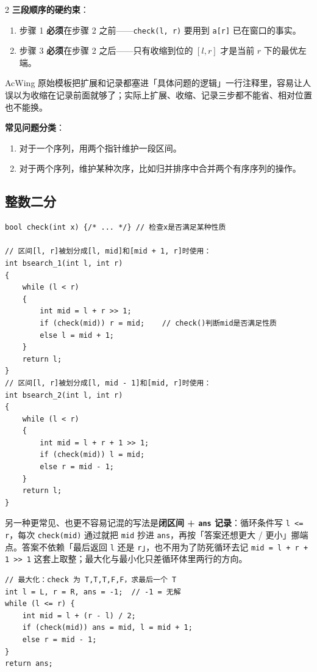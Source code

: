 \begin{multicols*}{2}
		\textbf{三段顺序的硬约束}：

		\begin{enumerate}
			\item 步骤 1 \textbf{必须}在步骤 2 之前——\texttt{check(l, r)} 要用到 \texttt{a[r]} 已在窗口的事实。
			\item 步骤 3 \textbf{必须}在步骤 2 之后——只有收缩到位的 $[l, r]$ 才是当前 $r$ 下的最优左端。
		\end{enumerate}

		AcWing 原始模板把扩展和记录都塞进「具体问题的逻辑」一行注释里，容易让人误以为收缩在记录前面就够了；实际上扩展、收缩、记录三步都不能省、相对位置也不能换。

		\textbf{常见问题分类}：

		\begin{enumerate}
			\item 对于一个序列，用两个指针维护一段区间。
			\item 对于两个序列，维护某种次序，比如归并排序中合并两个有序序列的操作。
		\end{enumerate}

		\subsection{整数二分}

		\begin{verbatim}
bool check(int x) {/* ... */} // 检查x是否满足某种性质

// 区间[l, r]被划分成[l, mid]和[mid + 1, r]时使用：
int bsearch_1(int l, int r)
{
    while (l < r)
    {
        int mid = l + r >> 1;
        if (check(mid)) r = mid;    // check()判断mid是否满足性质
        else l = mid + 1;
    }
    return l;
}
// 区间[l, r]被划分成[l, mid - 1]和[mid, r]时使用：
int bsearch_2(int l, int r)
{
    while (l < r)
    {
        int mid = l + r + 1 >> 1;
        if (check(mid)) l = mid;
        else r = mid - 1;
    }
    return l;
}
		\end{verbatim}

		另一种更常见、也更不容易记混的写法是\textbf{闭区间 + \texttt{ans} 记录}：循环条件写 \texttt{l <= r}，每次 \texttt{check(mid)} 通过就把 \texttt{mid} 抄进 \texttt{ans}，再按「答案还想更大 / 更小」挪端点。答案不依赖「最后返回 \texttt{l} 还是 \texttt{r}」，也不用为了防死循环去记 \texttt{mid = l + r + 1 >> 1} 这套上取整；最大化与最小化只差循环体里两行的方向。

		\begin{verbatim}
// 最大化：check 为 T,T,T,F,F，求最后一个 T
int l = L, r = R, ans = -1;  // -1 = 无解
while (l <= r) {
    int mid = l + (r - l) / 2;
    if (check(mid)) ans = mid, l = mid + 1;
    else r = mid - 1;
}
return ans;


\end{verbatim}
\end{multicols*}
